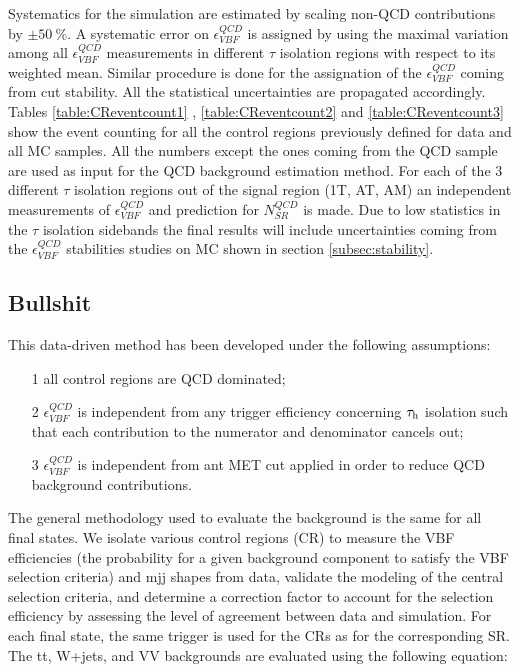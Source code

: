Systematics for the simulation are estimated by scaling non-QCD contributions by $\pm50~\%$. A systematic error on $\epsilon^{QCD}_{VBF}$ is assigned by using the maximal variation among all $\epsilon^{QCD}_{VBF}$ measurements in different $\tau$ isolation regions with respect to its weighted mean. Similar procedure is done for the assignation of the $\epsilon^{QCD}_{VBF}$ coming from \met cut stability. All the statistical uncertainties are propagated accordingly. Tables \ref{table:CReventcount1} , \ref{table:CReventcount2} and \ref{table:CReventcount3} show the event counting for all the control regions previously defined for data and all MC samples. All the numbers except the ones coming from the QCD sample are used as input for the QCD background estimation method. For each of the 3 different $\tau$ isolation regions out of the signal region (1T, AT, AM) an independent measurements of $\epsilon^{QCD}_{VBF}$  and prediction for $N^{QCD}_{SR}$ is made. Due to low statistics in the $\tau$ isolation sidebands the final results will include uncertainties coming from the $\epsilon^{QCD}_{VBF}$ stabilities studies on MC shown in section \ref{subsec:stability}.









\subsection{Bullshit}


This data-driven method has been developed under the following assumptions:

\begin{itemize}
	\item[1] all control regions are QCD dominated;
	\item[2] $\epsilon^{QCD}_{VBF}$ is independent from any trigger efficiency concerning $\tau_{\text{h}}$ isolation such that each contribution to the numerator and denominator cancels out;
	\item[3] $\epsilon^{QCD}_{VBF}$ is independent from ant MET cut applied in order to reduce QCD background contributions. 
\end{itemize}



The general methodology used to evaluate the background is the same for all final states. We isolate various control regions (CR) to measure the VBF efficiencies (the probability for a given background component to satisfy the VBF selection criteria) and mjj shapes from data, validate the modeling of the central selection criteria, and determine a correction factor to account for the selection efficiency by assessing the level of agreement between data and simulation. For each final state, the same trigger is used for the CRs as for the corresponding SR.  The tt, W+jets, and VV backgrounds are evaluated using the following equation:




